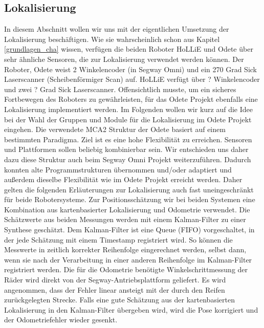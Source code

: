 \subsection{Lokalisierung} 
In diesem Abschnitt wollen wir uns mit der eigentlichen Umsetzung der
 Lokalisierung beschäftigen. Wie sie wahrscheinlich schon aus Kapitel
 \ref{grundlagen_cha} wissen, verfügen die beiden Roboter HoLLiE und
 Odete über sehr ähnliche Sensoren, die zur Lokalisierung verwendet werden
 können. Der Roboter, Odete weist 2 Winkelencoder (in Segway
 Omni) und ein 270 Grad Sick Laserscanner (Scheibenförmiger Scan)
 auf.
 HoLLiE verfügt über ? Winkelencoder und zwei
 ? Grad Sick Laserscanner. Offensichtlich musste,
 um ein sicheres Fortbewegen des Roboters zu gewährleisten, für das Odete Projekt
 ebenfalls eine Lokalisierung implementiert werden.
 Im Folgenden wollen wir kurz auf die Idee bei der Wahl der Gruppen
 und Module für die Lokalisierung im Odete Projekt eingehen.
 Die verwendete MCA2 Struktur der Odete basiert auf einem bestimmten Paradigma.
 Ziel ist es eine hohe Flexibilität zu erreichen. Sensoren und Plattformen sollen
 beliebig kombinierbar sein. Wir entschieden uns daher dazu diese Struktur auch
 beim Segway Omni Projekt weiterzuführen. Dadurch konnten alte Programmstrukturen
 übernommen und/oder adaptiert und außerdem dieselbe Flexibilität wie im Odete Projekt
 erreicht werden. Daher gelten die folgenden Erläuterungen zur Lokalisierung
 auch fast uneingeschränkt für beide Robotersysteme.
 Zur Positionsschätzung wir bei beiden Systemen eine Kombination aus kartenbasierter Lokalisierung
 und Odometrie verwendet. Die Schätzwerte aus beiden Messungen werden mit einem Kalman-Filter zu einer
 Synthese geschätzt. Dem Kalman-Filter ist eine Queue (FIFO) vorgeschaltet, in der jede Schätzung
 mit einem Timestamp registriert wird. So können die Messwerte in zeitlich korrekter Reihenfolge
 eingerechnet werden, selbst dann, wenn sie nach der Verarbeitung in einer anderen Reihenfolge
 im Kalman-Filter registriert werden. Die für die Odometrie benötigte Winkelschrittmessung der Räder wird direkt
 von der Segway-Antriebsplattform geliefert.
 Es wird angenommen, dass der Fehler linear ansteigt mit der durch den Reifen zurückgelegten Strecke.
 Falls eine gute Schätzung aus der kartenbasierten Lokalisierung in den Kalman-Filter übergeben wird,
 wird die Pose korrigiert und der Odometriefehler wieder gesenkt.



